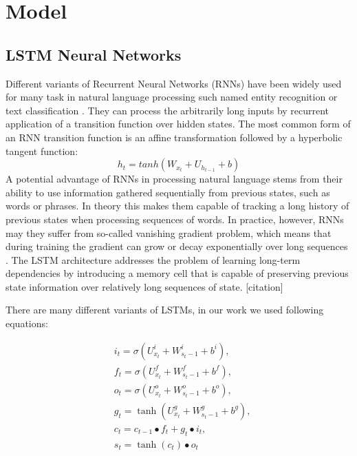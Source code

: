 \documentclass[10pt, a4paper]{article}
\begin{document}
\section{Model} 


\subsection{LSTM Neural Networks}

Different variants of Recurrent Neural Networks (RNNs) have been widely used for many task in natural language processing such named entity recognition \cite{lample2016neural} or text classification \cite{lai2015recurrent}. They can process the arbitrarily long inputs by recurrent application of a transition function over hidden states. The most common form of an RNN transition function is an affine transformation followed by a hyperbolic tangent function:
	\begin{equation} h_t = tanh(W_{x_t}+U_{h_{t-1}}+b)
\end{equation}
	A potential advantage of RNNs in processing natural language stems from their ability to use information gathered sequentially from previous states, such as words or phrases. In theory this makes them capable of tracking a long history of previous states when processing sequences of words. In practice, however, RNNs may they suffer from so-called vanishing gradient problem, which means that during training the gradient can grow or decay exponentially over long sequences \cite{bengio1994learning,hochreiter1998vanishing}. The LSTM architecture \cite{hochreiter1997long} addresses the problem of learning long-term dependencies by introducing a memory cell that is capable of preserving previous state information over relatively long sequences of state. [citation]
\par There are many different variants of LSTMs, in our work we used following equations:
		
\begin{equation}
\begin{split}
		&i_t = \sigma(U_{x_t}^i + W_{s_t-1}^i + b^i) ,\\
		&f_t = \sigma(U_{x_t}^f + W_{s_t-1}^f + b^f) ,\\
		&o_t = \sigma(U_{x_t}^o + W_{s_t-1}^o + b^o) ,\\
		&g_t = \tanh(U_{x_t}^g+ W_{s_t-1}^g + b^g) ,\\
		&c_t = c_{t-1} \bullet f_t + g_t \bullet i_t ,\\
		&s_t = \tanh(c_t) \bullet o_t 
\end{split}
\end{equation}
\end{document}
